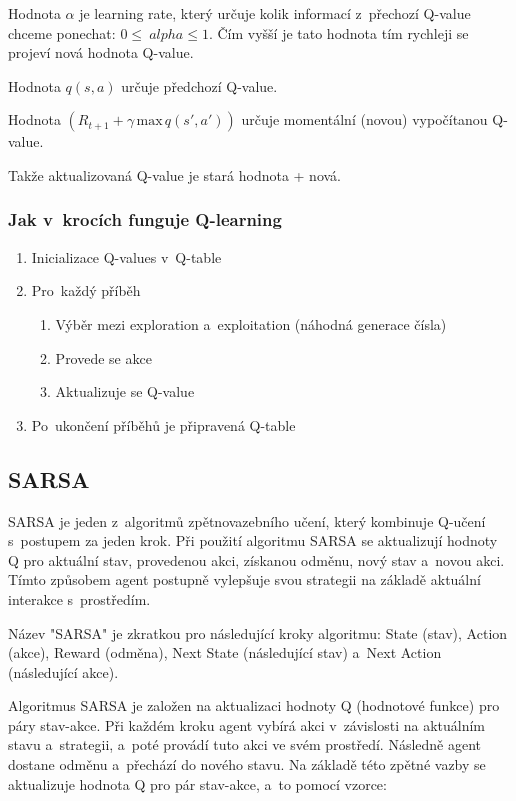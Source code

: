 Hodnota $\alpha$ je learning rate, který určuje kolik informací z~přechozí Q-value chceme ponechat: $0 \leq\ alpha \leq 1$.
Čím vyšší je tato hodnota tím rychleji se projeví nová hodnota Q-value.

Hodnota $q(s,a)$ určuje předchozí Q-value.

Hodnota $\left(R_{t+1} + \gamma\,\text{max}\,q(s',a')\right)$ určuje momentální (novou) vypočítanou Q-value.

Takže aktualizovaná Q-value je stará hodnota + nová.

\subsubsection{Jak v~krocích funguje Q-learning}

\begin{enumerate}
    \item Inicializace Q-values v~Q-table
    \item Pro~každý příběh
          \begin{enumerate}
              \item Výběr mezi exploration a~exploitation (náhodná generace čísla)
              \item Provede se akce
              \item Aktualizuje se Q-value
          \end{enumerate}
    \item Po~ukončení příběhů je připravená Q-table
\end{enumerate}

\subsection{SARSA}

SARSA je jeden z~algoritmů zpětnovazebního učení, který kombinuje Q-učení s~postupem za jeden krok. Při použití algoritmu SARSA se aktualizují hodnoty Q pro aktuální stav, provedenou akci, získanou odměnu, nový stav a~novou akci. Tímto způsobem agent postupně vylepšuje svou strategii na základě aktuální interakce s~prostředím.

Název "SARSA" je zkratkou pro následující kroky algoritmu: State (stav), Action (akce), Reward (odměna), Next State (následující stav) a~Next Action (následující akce).

Algoritmus SARSA je založen na aktualizaci hodnoty Q (hodnotové funkce) pro páry stav-akce. Při každém kroku agent vybírá akci v~závislosti na aktuálním stavu a~strategii, a~poté provádí tuto akci ve svém prostředí. Následně agent dostane odměnu a~přechází do nového stavu. Na základě této zpětné vazby se aktualizuje hodnota Q pro pár stav-akce, a~to pomocí vzorce:

